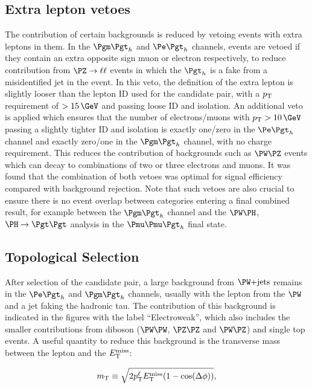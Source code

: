 \subsection{Extra lepton vetoes}

The contribution of certain backgrounds is reduced by vetoing events with extra
leptons in them. In the $\mutau$ and $\etau$ channels, events are vetoed if they contain an extra
opposite sign muon or electron respectively, to reduce contribution from 
$\PZ\to\ell\ell$ events in which the $\Pgth$ is a fake from a misidentified 
jet in the event. In this veto, the definition of the extra lepton is slightly 
looser than the lepton ID used for the candidate pair, with a $p_{\mathrm{T}}$ requirement
of $>15\,\GeV$ and passing loose ID and isolation. 
An additional veto is applied which ensures that the number of
electrons/muons with $\pt>10\,\GeV$ passing a slightly tighter ID and isolation
is exactly one/zero in the $\etau$ channel and exactly zero/one in the $\mutau$ channel, with no charge
requirement. This reduces the contribution of backgrounds such as $\PW\PZ$
events which can decay to combinations of two or three electrons and muons. 
It was found that the combination of both vetoes was optimal for signal
efficiency compared with background rejection. Note that such vetoes are also crucial 
to ensure there is no event overlap between categories entering a final combined 
result, for example between the $\mutau$ channel and the 
$\PW\PH$, $\PH\to\Pgt\Pgt$ analysis in the $\Pmu\Pmu\Pgth$ final state. 

\subsection{Topological Selection}
\label{sec:topologicalselection}

After selection of the candidate pair, a large background from $\WJets$ remains
in the $\etau$ and $\mutau$ channels, usually with the lepton from the $\PW$ and
a jet faking the hadronic tau. The contribution of this background is indicated
in the figures with the label ``Electroweak'', which also includes the smaller
contributions from diboson ($\PW\PW$, $\PZ\PZ$ and
$\PW\PZ$) and single top events. A useful quantity to reduce this background is
the transverse mass between the lepton and the $E_{\mathrm{T}}^{\text{miss}}$:

\begin{equation}
m_{\text{T}}\equiv\sqrt{2p_{\mathrm{T}}^{\ell}E_{\mathrm{T}}^{\text{miss}}(1-\cos(\Delta\phi))},
\end{equation}

